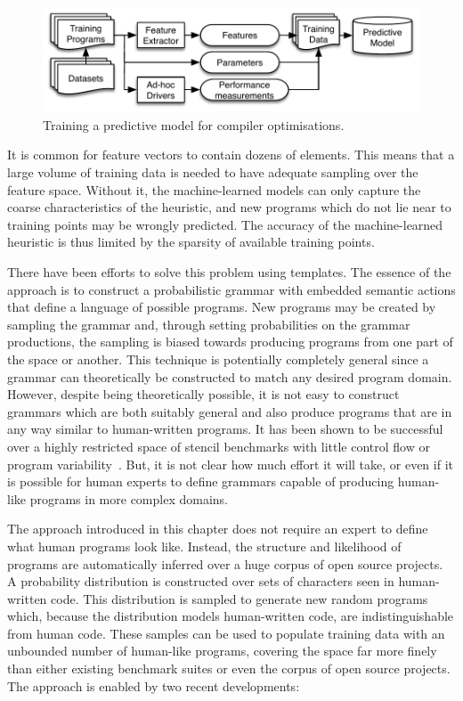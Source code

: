 \begin{figure}
  \includegraphics[width=\columnwidth]{img/overview-a}%
  \caption[Training a predictive model for compiler optimisations]{Training a predictive model for compiler optimisations. }%
  \label{fig:training-a-predictive-model}
\end{figure}

It is common for feature vectors to contain dozens of elements. This means that a large volume of training data is needed to have adequate sampling over the feature space. Without it, the machine-learned models can only capture the coarse characteristics of the heuristic, and new programs which do not lie near to training points may be wrongly predicted. The accuracy of the machine-learned heuristic is thus limited by the sparsity of available training points.

There have been efforts to solve this problem using templates. The essence of the approach is to construct a probabilistic grammar with embedded semantic actions that define a language of possible programs. New programs may be created by sampling the grammar and, through setting probabilities on the grammar productions, the sampling is biased towards producing programs from one part of the space or another. This technique is potentially completely general since a grammar can theoretically be constructed to match any desired program domain. However, despite being theoretically possible, it is not easy to construct grammars which are both suitably general and also produce programs that are in any way similar to human-written programs. It has been shown to be successful over a highly restricted space of stencil benchmarks with little control flow or program variability~\cite{Falch2015,Cummins2016a}. But, it is not clear how much effort it will take, or even if it is possible for human experts to define grammars capable of producing human-like programs in more complex domains.

The approach introduced in this chapter does not require an expert to define what human programs look like. Instead, the structure and likelihood of programs are automatically inferred over a huge corpus of open source projects. A probability distribution is constructed over sets of characters seen in human-written code. This distribution is sampled to generate new random programs which, because the distribution models human-written code, are indistinguishable from human code. These samples can be used to populate training data with an unbounded number of human-like programs, covering the space far more finely than either existing benchmark suites or even the corpus of open source projects. The approach is enabled by two recent developments:

